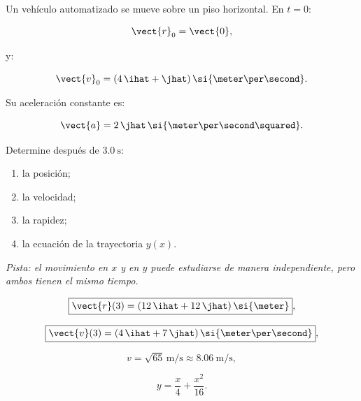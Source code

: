 \begin{ejercicio}
Un vehículo automatizado se mueve sobre un piso horizontal. En \(t=0\):

\[
\vect{r}_0=\vect{0},
\]

y:

\[
\vect{v}_0
=
(4\,\ihat+\jhat)\,
\si{\meter\per\second}.
\]

Su aceleración constante es:

\[
\vect{a}
=
2\,\jhat\,
\si{\meter\per\second\squared}.
\]

Determine después de \(\SI{3.0}{\second}\):

\begin{enumerate}[label=\alph*)]
    \item la posición;
    \item la velocidad;
    \item la rapidez;
    \item la ecuación de la trayectoria \(y(x)\).
\end{enumerate}

\textit{Pista: el movimiento en \(x\) y en \(y\) puede estudiarse de manera independiente, pero ambos tienen el mismo tiempo.}
\end{ejercicio}

\begin{respuesta}
\[
\boxed{
\vect{r}(3)
=
(12\,\ihat+12\,\jhat)\,\si{\meter}
},
\]

\[
\boxed{
\vect{v}(3)
=
(4\,\ihat+7\,\jhat)\,
\si{\meter\per\second}
},
\]

\[
\boxed{
v=\sqrt{65}\,\si{\meter\per\second}
\approx
\SI{8.06}{\meter\per\second}
},
\]

\[
\boxed{
y=\frac{x}{4}+\frac{x^2}{16}
}.
\]
\end{respuesta}

